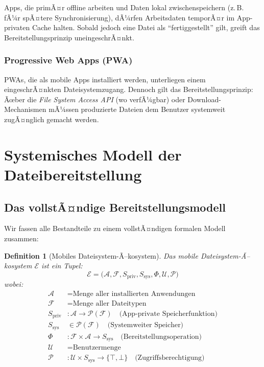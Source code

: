 ﻿\documentclass[12pt, a4paper]{article}
\newtheorem{definition}{Definition}[section]
\begin{document}
Apps, die primÃ¤r offline arbeiten und Daten lokal zwischenspeichern (z.\,B. fÃ¼r
spÃ¤tere Synchronisierung), dÃ¼rfen Arbeitsdaten temporÃ¤r im App-privaten Cache
halten. Sobald jedoch eine Datei als \enquote{fertiggestellt} gilt, greift das
Bereitstellungsprinzip uneingeschrÃ¤nkt.

\subsubsection{Progressive Web Apps (PWA)}

PWAs, die als mobile Apps installiert werden, unterliegen einem eingeschrÃ¤nkten
Dateisystemzugang. Dennoch gilt das Bereitstellungsprinzip: Ãœber die
\emph{File System Access API} (wo verfÃ¼gbar) oder Download-Mechanismen
mÃ¼ssen produzierte Dateien dem Benutzer systemweit zugÃ¤nglich gemacht werden.

\section{Systemisches Modell der Dateibereitstellung}
\label{sec:modell}

\subsection{Das vollstÃ¤ndige Bereitstellungsmodell}

Wir fassen alle Bestandteile zu einem vollstÃ¤ndigen formalen Modell zusammen:

\begin{definition}[Mobiles Dateisystem-Ã–kosystem]
Das \emph{mobile Dateisystem-Ã–kosystem} $\mathcal{E}$ ist ein Tupel:
\[
  \mathcal{E} = \big(\mathcal{A}, \mathcal{F}, S_{\text{priv}}, S_{\text{sys}}, \Phi, \mathcal{U}, \mathcal{P}\big)
\]
wobei:
\begin{align*}
  \mathcal{A} &= \text{Menge aller installierten Anwendungen} \\
  \mathcal{F} &= \text{Menge aller Dateitypen} \\
  S_{\text{priv}} &: \mathcal{A} \to \mathcal{P}(\mathcal{F}) \quad \text{(App-private Speicherfunktion)} \\
  S_{\text{sys}} &\in \mathcal{P}(\mathcal{F}) \quad \text{(Systemweiter Speicher)} \\
  \Phi &: \mathcal{F} \times \mathcal{A} \to S_{\text{sys}} \quad \text{(Bereitstellungsoperation)} \\
  \mathcal{U} &= \text{Benutzermenge} \\
  \mathcal{P} &: \mathcal{U} \times S_{\text{sys}} \to \{\top, \bot\} \quad \text{(Zugriffsberechtigung)}
\end{align*}
\end{definition}
\end{document}
